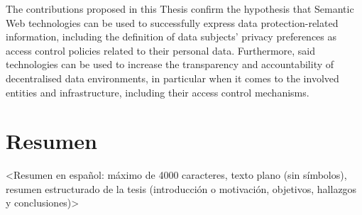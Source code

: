 The contributions proposed in this Thesis confirm the hypothesis that Semantic Web technologies can be used to successfully express data protection-related information, including the definition of data subjects' privacy preferences as access control policies related to their personal data.
Furthermore, said technologies can be used to increase the transparency and accountability of decentralised data environments, in particular when it comes to the involved entities and infrastructure, including their access control mechanisms.

\newpage
\section*{Resumen}
\label{sec::resumen}


<Resumen en español: máximo de 4000 caracteres, texto plano (sin símbolos), resumen estructurado de la tesis (introducción o motivación, objetivos, hallazgos y conclusiones)>

